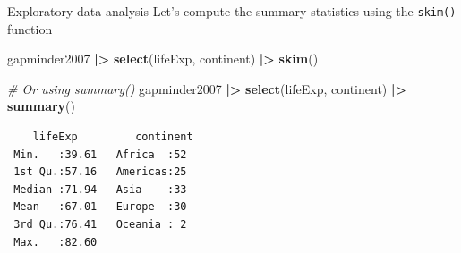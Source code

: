 \documentclass[
  ignorenonframetext,
]{beamer}
\newenvironment{Shaded}{\begin{snugshade}}{\end{snugshade}}
\newcommand{\CommentTok}[1]{\textcolor[rgb]{0.56,0.35,0.01}{\textit{#1}}}
\newcommand{\FunctionTok}[1]{\textcolor[rgb]{0.13,0.29,0.53}{\textbf{#1}}}
\newcommand{\NormalTok}[1]{#1}
\newcommand{\SpecialCharTok}[1]{\textcolor[rgb]{0.81,0.36,0.00}{\textbf{#1}}}
\begin{document}
\begin{frame}[fragile]{Exploratory data analysis}
\protect\hypertarget{exploratory-data-analysis-3}{}
Let's compute the summary statistics using the \texttt{skim()} function

\normalsize

\begin{Shaded}
\begin{Highlighting}[]
\NormalTok{gapminder2007 }\SpecialCharTok{|\textgreater{}} 
  \FunctionTok{select}\NormalTok{(lifeExp, continent) }\SpecialCharTok{|\textgreater{}}
  \FunctionTok{skim}\NormalTok{()}
\end{Highlighting}
\end{Shaded}

\normalsize

\begin{Shaded}
\begin{Highlighting}[]
\CommentTok{\# Or using summary()}
\NormalTok{gapminder2007 }\SpecialCharTok{|\textgreater{}} 
  \FunctionTok{select}\NormalTok{(lifeExp, continent) }\SpecialCharTok{|\textgreater{}}
  \FunctionTok{summary}\NormalTok{()}
\end{Highlighting}
\end{Shaded}

\begin{verbatim}
    lifeExp         continent 
 Min.   :39.61   Africa  :52  
 1st Qu.:57.16   Americas:25  
 Median :71.94   Asia    :33  
 Mean   :67.01   Europe  :30  
 3rd Qu.:76.41   Oceania : 2  
 Max.   :82.60                
\end{verbatim}
\end{frame}
\end{document}
